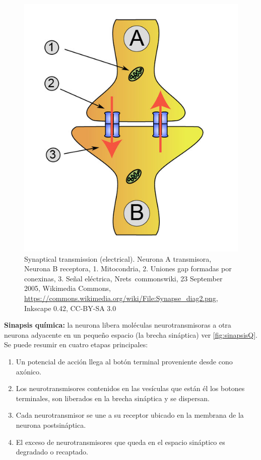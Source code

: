 \begin{figure}[h]
 \centering
 \includegraphics[scale=0.4]{../Figuras/sinapsisElectrica.png}
 \caption{Synaptical transmission (electrical). Neurona A transmisora, Neurona B receptora, 1. Mitocondria, 2. Uniones gap formadas por conexinas, 3. Señal eléctrica, Nrets~commonswiki, 23 September 2005, Wikimedia Commons, \url{https://commons.wikimedia.org/wiki/File:Synapse_diag2.png}, Inkscape 0.42, CC-BY-SA 3.0}
 \label{fig:sinapsisN}
\end{figure}
 
 \textbf{Sinapsis química:} la neurona libera moléculas neurotransmisoras a otra neurona adyacente en un pequeño espacio (la brecha sináptica) ver \ref{fig:sinapsisQ}. Se puede resumir en cuatro etapas principales:


\begin{enumerate}
 \item Un potencial de acción llega al botón terminal proveniente desde cono axónico.
 \item Los neurotransmisores contenidos en las vesículas que están él los botones terminales, son liberados en la brecha sináptica y se dispersan.
 \item Cada neurotransmisor se une a su receptor ubicado en la membrana de la neurona postsináptica.
 \item El exceso de neurotransmisores que queda en el espacio sináptico es degradado o recaptado.
\end{enumerate}


